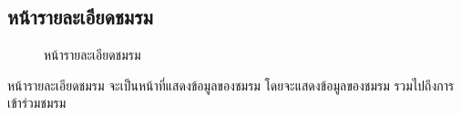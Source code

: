 \documentclass[14pt,oneside,openright,a4paper]{cpe-thai-project}
\begin{document}
\subsection{หน้ารายละเอียดชมรม}
\begin{figure}[!h]\centering
  \setlength{\fboxrule}{0.5mm} %
  \setlength{\fboxsep}{0.5cm}
  \caption{หน้ารายละเอียดชมรม}\label{fig:ui5}
\end{figure}
\hspace*{1cm} หน้ารายละเอียดชมรม จะเป็นหน้าที่แสดงข้อมูลของชมรม โดยจะแสดงข้อมูลของชมรม รวมไปถึงการเข้าร่วมชมรม

\newpage
\end{document}
